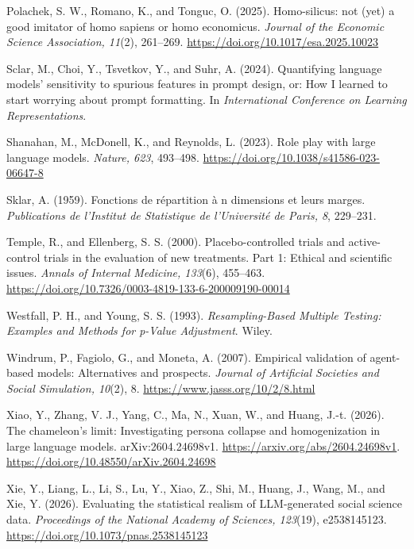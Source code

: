 \documentclass[11pt]{article}
\begin{document}
Polachek, S. W., Romano, K., and Tonguc, O. (2025). Homo-silicus: not
(yet) a good imitator of homo sapiens or homo economicus. \emph{Journal
of the Economic Science Association, 11}(2), 261--269.
\url{https://doi.org/10.1017/esa.2025.10023}

Sclar, M., Choi, Y., Tsvetkov, Y., and Suhr, A. (2024). Quantifying
language models' sensitivity to spurious features in prompt design, or:
How I learned to start worrying about prompt formatting. In
\emph{International Conference on Learning Representations}.

Shanahan, M., McDonell, K., and Reynolds, L. (2023). Role play with
large language models. \emph{Nature, 623}, 493--498.
\url{https://doi.org/10.1038/s41586-023-06647-8}

Sklar, A. (1959). Fonctions de répartition à n dimensions et leurs
marges. \emph{Publications de l'Institut de Statistique de l'Université
de Paris, 8}, 229--231.

Temple, R., and Ellenberg, S. S. (2000). Placebo-controlled trials and
active-control trials in the evaluation of new treatments. Part 1:
Ethical and scientific issues. \emph{Annals of Internal Medicine,
133}(6), 455--463.
\url{https://doi.org/10.7326/0003-4819-133-6-200009190-00014}

Westfall, P. H., and Young, S. S. (1993). \emph{Resampling-Based
Multiple Testing: Examples and Methods for p-Value Adjustment}. Wiley.

Windrum, P., Fagiolo, G., and Moneta, A. (2007). Empirical validation of
agent-based models: Alternatives and prospects. \emph{Journal of
Artificial Societies and Social Simulation, 10}(2), 8.
\url{https://www.jasss.org/10/2/8.html}

Xiao, Y., Zhang, V. J., Yang, C., Ma, N., Xuan, W., and Huang, J.-t.
(2026). The chameleon's limit: Investigating persona collapse and
homogenization in large language models. arXiv:2604.24698v1.
\url{https://arxiv.org/abs/2604.24698v1}.
\url{https://doi.org/10.48550/arXiv.2604.24698}

Xie, Y., Liang, L., Li, S., Lu, Y., Xiao, Z., Shi, M., Huang, J., Wang,
M., and Xie, Y. (2026). Evaluating the statistical realism of
LLM-generated social science data. \emph{Proceedings of the National
Academy of Sciences, 123}(19), e2538145123.
\url{https://doi.org/10.1073/pnas.2538145123}
\endgroup
\end{document}
